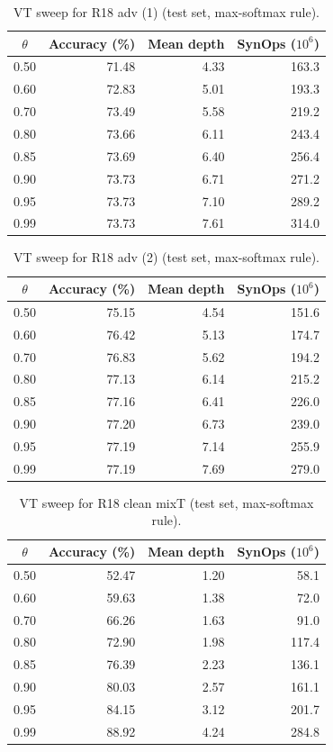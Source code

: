 \begin{table}[htbp]
\centering
\caption{VT sweep for R18 adv (1) (test set, max-softmax rule).}
\label{tab:app-vt-r18_adv_T8}
\footnotesize
\begin{tabular}{@{}c r r r@{}}
\toprule
$\theta$ & Accuracy (\%) & Mean depth & SynOps ($10^6$) \\
\midrule
0.50 & 71.48 & 4.33 & 163.3 \\
0.60 & 72.83 & 5.01 & 193.3 \\
0.70 & 73.49 & 5.58 & 219.2 \\
0.80 & 73.66 & 6.11 & 243.4 \\
0.85 & 73.69 & 6.40 & 256.4 \\
0.90 & 73.73 & 6.71 & 271.2 \\
0.95 & 73.73 & 7.10 & 289.2 \\
0.99 & 73.73 & 7.61 & 314.0 \\
\bottomrule
\end{tabular}
\end{table}

\begin{table}[htbp]
\centering
\caption{VT sweep for R18 adv (2) (test set, max-softmax rule).}
\label{tab:app-vt-r18_adv_T8_rep}
\footnotesize
\begin{tabular}{@{}c r r r@{}}
\toprule
$\theta$ & Accuracy (\%) & Mean depth & SynOps ($10^6$) \\
\midrule
0.50 & 75.15 & 4.54 & 151.6 \\
0.60 & 76.42 & 5.13 & 174.7 \\
0.70 & 76.83 & 5.62 & 194.2 \\
0.80 & 77.13 & 6.14 & 215.2 \\
0.85 & 77.16 & 6.41 & 226.0 \\
0.90 & 77.20 & 6.73 & 239.0 \\
0.95 & 77.19 & 7.14 & 255.9 \\
0.99 & 77.19 & 7.69 & 279.0 \\
\bottomrule
\end{tabular}
\end{table}

\begin{table}[htbp]
\centering
\caption{VT sweep for R18 clean mixT (test set, max-softmax rule).}
\label{tab:app-vt-r18_clean_mixT}
\footnotesize
\begin{tabular}{@{}c r r r@{}}
\toprule
$\theta$ & Accuracy (\%) & Mean depth & SynOps ($10^6$) \\
\midrule
0.50 & 52.47 & 1.20 & 58.1 \\
0.60 & 59.63 & 1.38 & 72.0 \\
0.70 & 66.26 & 1.63 & 91.0 \\
0.80 & 72.90 & 1.98 & 117.4 \\
0.85 & 76.39 & 2.23 & 136.1 \\
0.90 & 80.03 & 2.57 & 161.1 \\
0.95 & 84.15 & 3.12 & 201.7 \\
0.99 & 88.92 & 4.24 & 284.8 \\
\bottomrule
\end{tabular}
\end{table}

